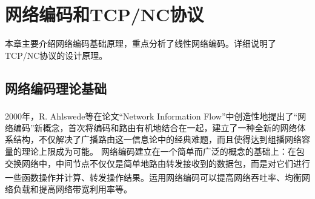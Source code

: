 \chapter{网络编码和TCP/NC协议}
本章主要介绍网络编码基础原理，重点分析了线性网络编码。详细说明了TCP/NC协议的设计原理。
\section{网络编码理论基础}
2000年，R. Ahlswede等在论文“Network Information Flow”\textsuperscript{\cite{Ahlswede2000}}中创造性地提出了“网络编码”新概念，首次将编码和路由有机地结合在一起，建立了一种全新的网络体系结构，不仅解决了广播路由这一信息论中的经典难题，而且使得达到组播网络容量的理论上限成为可能。
网络编码建立在一个简单而广泛的概念的基础上：在包交换网络中，中间节点不仅仅是简单地路由转发接收到的数据包，而是对它们进行一些函数操作并计算、转发操作结果\textsuperscript{\cite{meidaer2014}}。运用网络编码可以提高网络吞吐率、均衡网络负载和提高网络带宽利用率等。

